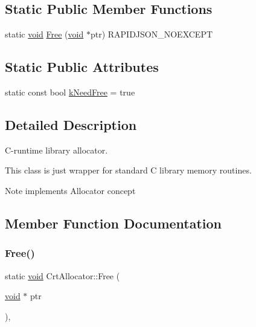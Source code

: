 \subsection*{Static Public Member Functions}
\begin{DoxyCompactItemize}
\item 
static \hyperlink{imgui__impl__opengl3__loader_8h_ac668e7cffd9e2e9cfee428b9b2f34fa7}{void} \hyperlink{classCrtAllocator_aa09ed06f0decbedcaaa2c2a417820a79}{Free} (\hyperlink{imgui__impl__opengl3__loader_8h_ac668e7cffd9e2e9cfee428b9b2f34fa7}{void} $\ast$ptr) R\+A\+P\+I\+D\+J\+S\+O\+N\+\_\+\+N\+O\+E\+X\+C\+E\+PT
\end{DoxyCompactItemize}
\subsection*{Static Public Attributes}
\begin{DoxyCompactItemize}
\item 
static const bool \hyperlink{classCrtAllocator_ac7df8398c529290f0cd5950d9492f524}{k\+Need\+Free} = true
\end{DoxyCompactItemize}


\subsection{Detailed Description}
C-\/runtime library allocator. 

This class is just wrapper for standard C library memory routines. \begin{DoxyNote}{Note}
implements Allocator concept 
\end{DoxyNote}


\subsection{Member Function Documentation}
\mbox{\label{classCrtAllocator_aa09ed06f0decbedcaaa2c2a417820a79}} 
\subsubsection{\texorpdfstring{Free()}{Free()}}
{\footnotesize\ttfamily static \hyperlink{imgui__impl__opengl3__loader_8h_ac668e7cffd9e2e9cfee428b9b2f34fa7}{void} Crt\+Allocator\+::\+Free (\begin{DoxyParamCaption}\item[{\hyperlink{imgui__impl__opengl3__loader_8h_ac668e7cffd9e2e9cfee428b9b2f34fa7}{void} $\ast$}]{ptr }\end{DoxyParamCaption})\hspace{0.3cm}{\ttfamily [inline]}, {\ttfamily [static]}}

